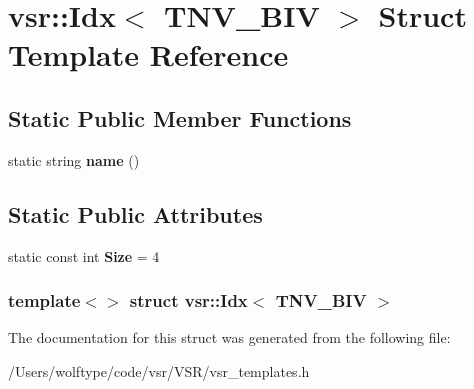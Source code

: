 \hypertarget{structvsr_1_1_idx_3_01_t_n_v___b_i_v_01_4}{\section{vsr\-:\-:Idx$<$ T\-N\-V\-\_\-\-B\-I\-V $>$ Struct Template Reference}
\label{structvsr_1_1_idx_3_01_t_n_v___b_i_v_01_4}
}
\subsection*{Static Public Member Functions}
\begin{DoxyCompactItemize}
\item 
\hypertarget{structvsr_1_1_idx_3_01_t_n_v___b_i_v_01_4_a4be2637f8990a3e52c091c0934712aeb}{static string {\bfseries name} ()}\label{structvsr_1_1_idx_3_01_t_n_v___b_i_v_01_4_a4be2637f8990a3e52c091c0934712aeb}

\end{DoxyCompactItemize}
\subsection*{Static Public Attributes}
\begin{DoxyCompactItemize}
\item 
\hypertarget{structvsr_1_1_idx_3_01_t_n_v___b_i_v_01_4_aa044ff93eee29a36be230b7a03d6a114}{static const int {\bfseries Size} = 4}\label{structvsr_1_1_idx_3_01_t_n_v___b_i_v_01_4_aa044ff93eee29a36be230b7a03d6a114}

\end{DoxyCompactItemize}
\subsubsection*{template$<$$>$ struct vsr\-::\-Idx$<$ T\-N\-V\-\_\-\-B\-I\-V $>$}



The documentation for this struct was generated from the following file\-:\begin{DoxyCompactItemize}
\item 
/\-Users/wolftype/code/vsr/\-V\-S\-R/vsr\-\_\-templates.\-h\end{DoxyCompactItemize}
